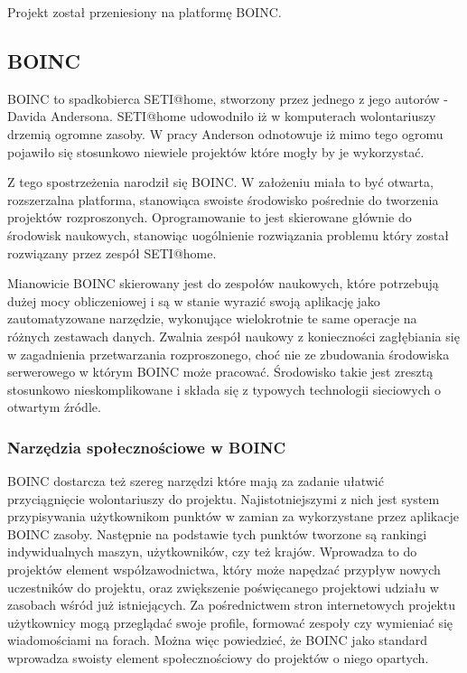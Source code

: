 \documentclass[12pt,a4paper,twoside]{article}
\begin{document}
Projekt został przeniesiony na platformę BOINC.

\subsection{BOINC}

BOINC to spadkobierca SETI@home, stworzony przez jednego z jego autorów - Davida Andersona. SETI@home udowodniło iż w komputerach wolontariuszy drzemią ogromne zasoby. W pracy \cite{boinc} Anderson odnotowuje iż mimo tego ogromu pojawiło się stosunkowo niewiele projektów które mogły by je wykorzystać.

Z tego spostrzeżenia narodził się BOINC. W założeniu miała to być otwarta, rozszerzalna platforma, stanowiąca swoiste środowisko pośrednie do tworzenia projektów rozproszonych. Oprogramowanie to jest skierowane głównie do środowisk naukowych, stanowiąc uogólnienie rozwiązania problemu który został rozwiązany przez zespół SETI@home. 

Mianowicie BOINC skierowany jest do zespołów naukowych, które potrzebują dużej mocy obliczeniowej i są w stanie wyrazić swoją aplikację jako zautomatyzowane narzędzie, wykonujące wielokrotnie te same operacje na różnych zestawach danych. Zwalnia zespół naukowy z konieczności zagłębiania się w zagadnienia przetwarzania rozproszonego, choć nie ze zbudowania środowiska serwerowego w którym BOINC może pracować. Środowisko takie jest zresztą stosunkowo nieskomplikowane i składa się z typowych technologii sieciowych o otwartym źródle.

\subsubsection{Narzędzia społecznościowe w BOINC}

BOINC dostarcza też szereg narzędzi które mają za zadanie ułatwić przyciągnięcie wolontariuszy do projektu. Najistotniejszymi z nich jest system przypisywania użytkownikom punktów w zamian za wykorzystane przez aplikacje BOINC zasoby. Następnie na podstawie tych punktów tworzone są rankingi indywidualnych maszyn, użytkowników, czy też krajów. Wprowadza to do projektów element współzawodnictwa, który może napędzać przypływ nowych uczestników do projektu, oraz zwiększenie poświęcanego projektowi udziału w zasobach wśród już istniejących. Za pośrednictwem stron internetowych projektu użytkownicy mogą przeglądać swoje profile, formować zespoły czy wymieniać się wiadomościami na forach. Można więc powiedzieć, że BOINC jako standard wprowadza swoisty element społecznościowy do projektów o niego opartych.
\end{document}
